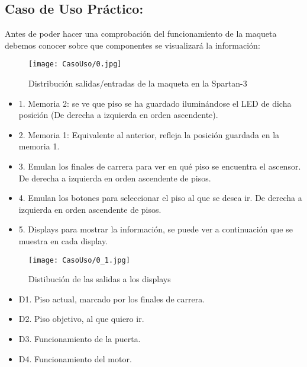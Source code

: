 \subsection{Caso de Uso Práctico:}
	
	Antes de poder hacer una comprobación del funcionamiento de la maqueta debemos conocer sobre que componentes se visualizará la información:
	
	\begin{figure}[H]
        \centering
        \texttt{[image: CasoUso/0.jpg]}
        \caption{Distribución salidas/entradas de la maqueta en la Spartan-3}
        \label{fig:Spartan3Interfaz}
    \end{figure}
    
    
    \begin{itemize}
	    \item 1. Memoria 2: se ve que piso se ha guardado iluminándose el LED de dicha posición (De derecha a izquierda en orden ascendente).
	    \item 2. Memoria 1: Equivalente al anterior, refleja la posición guardada en la memoria 1.
	    \item 3. Emulan los finales de carrera para ver en qué piso se encuentra el ascensor. De derecha a izquierda en orden ascendente de pisos.
	    \item 4. Emulan los botones para seleccionar el piso al que se desea ir. De derecha a izquierda en orden ascendente de pisos.
	    \item 5. Displays para mostrar la información, se puede ver a continuación que se muestra en cada display.
	\end{itemize} 
	
	\begin{figure}[H]
        \centering
        \texttt{[image: CasoUso/0\_1.jpg]}
        \caption{Distibución de las salidas a los displays}
        \label{fig:Spartan3InterfazDisplays}
    \end{figure}
    
    \begin{itemize}
		    \item  D1. Piso actual, marcado por los finales de carrera.
		    \item  D2. Piso objetivo, al que quiero ir.
		    \item  D3. Funcionamiento de la puerta.
		    \item  D4. Funcionamiento del motor.
	\end{itemize} 
	

